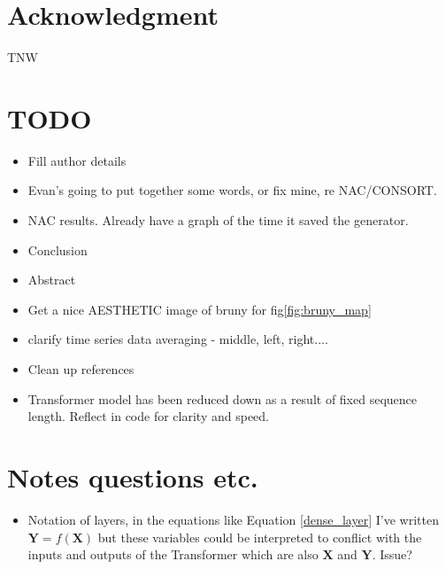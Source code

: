 \documentclass[conference]{IEEEtran}
\begin{document}
\section*{Acknowledgment}
TNW





\section{TODO} 
\begin{itemize}
	\item Fill author details
	\item Evan's going to put together some words, or fix mine, re NAC/CONSORT.
	\item NAC results. Already have a graph of the time it saved the generator.
	\item Conclusion
	\item Abstract
	\item Get a nice AESTHETIC image of bruny for fig\ref{fig:bruny_map}
	\item clarify time series data averaging - middle, left, right....
	\item Clean up references
	\item Transformer model has been reduced down as a result of fixed sequence length. Reflect in code for clarity and speed.
\end{itemize}

\section{Notes questions etc.} 
\begin{itemize}
	\item Notation of layers, in the equations like Equation \ref{dense_layer} I've written $\textbf{Y} = f(\textbf{X})$ but these variables could be interpreted to conflict with the inputs and outputs of the Transformer which are also $\textbf{X}$ and $\textbf{Y}$. Issue?
\end{itemize}
\end{document}
